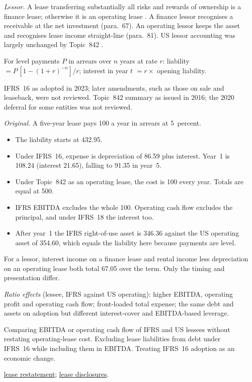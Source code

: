 \begin{qfmethod}
\emph{Lessor.} A lease transferring substantially all risks and rewards of ownership is a finance lease; otherwise it is an operating lease \citep[IFRS~16 paras.~61--63]{eu-2023-1803-ifrs16}. A finance lessor recognises a receivable at the net investment (para.~67). An operating lessor keeps the asset and recognises lease income straight-line (para.~81). US lessor accounting was largely unchanged by Topic~842 \citep[p.~4]{us-leases-2016}.

 For level payments $P$ in arrears over $n$ years at rate $r$: liability $=P\,[1-(1+r)^{-n}]/r$; interest in year $t$ $=r\times$ opening liability.

 IFRS~16 as adopted in 2023; later amendments, such as those on sale and leaseback, were not reviewed. Topic~842 summary as issued in 2016; the 2020 deferral for some entities was not reviewed.

 \emph{Original.} A five-year lease pays 100 a year in arrears at 5~percent.
\begin{itemize}
\item The liability starts at 432.95.
\item Under IFRS~16, expense is depreciation of 86.59 plus interest. Year~1 is 108.24 (interest 21.65), falling to 91.35 in year~5.
\item Under Topic~842 as an operating lease, the cost is 100 every year. Totals are equal at 500.
\item IFRS EBITDA excludes the whole 100. Operating cash flow excludes the principal, and under IFRS~18 the interest too.
\item After year~1 the IFRS right-of-use asset is 346.36 against the US operating asset of 354.60, which equals the liability here because payments are level.
\end{itemize}
For a lessor, interest income on a finance lease and rental income less depreciation on an operating lease both total 67.05 over the term. Only the timing and presentation differ.

\emph{Ratio effects} (lessee, IFRS against US operating): higher EBITDA, operating profit and operating cash flow; front-loaded total expense; the same debt and assets on adoption but different interest-cover and EBITDA-based leverage.

 Comparing EBITDA or operating cash flow of IFRS and US lessees without restating operating-lease cost. Excluding lease liabilities from debt under IFRS~16 while including them in EBITDA. Treating IFRS~16 adoption as an economic change.

 \hyperref[meth:accounting-analysis-adjustments]{lease restatement}; \hyperref[def:long-term-liability-compensation-disclosures]{lease disclosures}.

\end{qfmethod}

